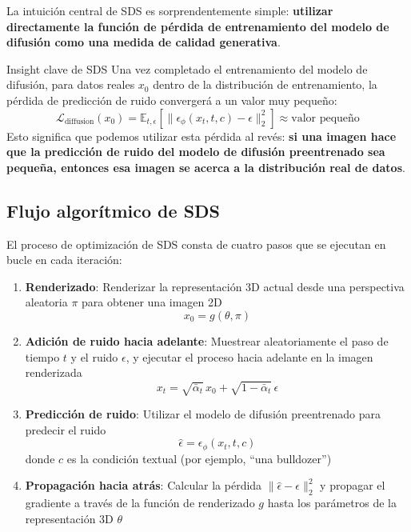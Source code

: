 \documentclass[a4paper]{article}
\begin{document}
La intuición central de SDS es sorprendentemente simple: \textbf{utilizar directamente la función de pérdida de entrenamiento del modelo de difusión como una medida de calidad generativa}.

\begin{importantbox}{Insight clave de SDS}
Una vez completado el entrenamiento del modelo de difusión, para datos reales $x_0$ dentro de la distribución de entrenamiento, la pérdida de predicción de ruido convergerá a un valor muy pequeño:
$$
\mathcal{L}_{\text{diffusion}}(x_0) = \mathbb{E}_{t, \epsilon}\left[\| \epsilon_\phi(x_t, t, c) - \epsilon \|_2^2\right] \approx \text{valor pequeño}
$$
Esto significa que podemos utilizar esta pérdida al revés: \textbf{si una imagen hace que la predicción de ruido del modelo de difusión preentrenado sea pequeña, entonces esa imagen se acerca a la distribución real de datos}.
\end{importantbox}

\subsection{Flujo algorítmico de SDS}

El proceso de optimización de SDS consta de cuatro pasos que se ejecutan en bucle en cada iteración:

\begin{enumerate}
    \item \textbf{Renderizado}: Renderizar la representación 3D actual desde una perspectiva aleatoria $\pi$ para obtener una imagen 2D
    $$x_0 = g(\theta, \pi)$$

    \item \textbf{Adición de ruido hacia adelante}: Muestrear aleatoriamente el paso de tiempo $t$ y el ruido $\epsilon$, y ejecutar el proceso hacia adelante en la imagen renderizada
    $$x_t = \sqrt{\bar{\alpha}_t}\, x_0 + \sqrt{1 - \bar{\alpha}_t}\, \epsilon$$

    \item \textbf{Predicción de ruido}: Utilizar el modelo de difusión preentrenado para predecir el ruido
    $$\hat{\epsilon} = \epsilon_\phi(x_t, t, c)$$
    donde $c$ es la condición textual (por ejemplo, ``una bulldozer'')

    \item \textbf{Propagación hacia atrás}: Calcular la pérdida $\| \hat{\epsilon} - \epsilon \|_2^2$ y propagar el gradiente a través de la función de renderizado $g$ hasta los parámetros de la representación 3D $\theta$
\end{enumerate}
\end{document}
